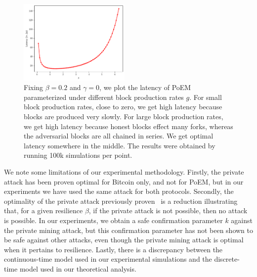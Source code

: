 \begin{figure}[pt]
    \centering
    \includegraphics[width = 0.48\textwidth]{figures/g_latency.pdf}

  \caption{Fixing $\beta=0.2$ and $\gamma=0$, we plot the latency of PoEM parameterized under different block production rates $g$.
          For small block production rates, close to zero, we get high latency because blocks are produced very slowly.
          For large block production rates, we get high latency because honest blocks effect many forks, whereas the adversarial blocks
          are all chained in series. We get optimal latency somewhere in the middle.
          The results were obtained by running 100k simulations per point.}
    \label{fig:g_latency}
\end{figure}

We note some limitations of our experimental methodology. Firstly, the private attack has been proven optimal
for Bitcoin only, and not for PoEM, but in our experiments we have used the same attack for both protocols.
Secondly, the optimality of the private attack previously proven~\cite{eiar} is a reduction illustrating
that, for a given resilience $\beta$, if the private attack is not possible, then no attack is possible.
In our experiments, we obtain a safe confirmation parameter $k$ against the private mining attack,
but this confirmation parameter has not been shown to be safe against other attacks, even though the private
mining attack is optimal when it pertains to resilience.
Lastly, there is a discrepancy between the continuous-time model used in our experimental simulations
and the discrete-time model used in our theoretical analysis.